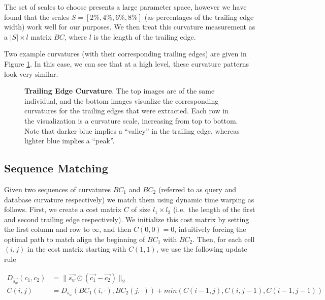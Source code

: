 The set of scales to choose presents a large parameter space, however we have found that the scales $S = [2\%, 4\%, 6\%, 8\%]$ (as percentages of the trailing edge width) work well for our purposes.
We then treat this curvature measurement as a $|S| \times l$ matrix $BC$, where $l$ is the length of the trailing edge.

Two example curvatures (with their corresponding trailing edges) are given in Figure \ref{fig:example_curv}.
In this case, we can see that at a high level, these curvature patterns look very similar.

\begin{figure}[t]%
\centering
{}
\newline
{}
\caption[]{\textbf{Trailing Edge Curvature}. The top images are of the same individual, and the bottom images visualize the corresponding curvatures for the trailing edges that were extracted. Each row in the visualization is a curvature scale, increasing from top to bottom. Note that darker blue implies a ``valley'' in the trailing edge, whereas lighter blue implies a ``peak''.}
\label{fig:example_curv}
\end{figure}




\subsection{Sequence Matching}

Given two sequences of curvatures $BC_1$ and $BC_2$ (referred to as query and database curvature respectively) we match them using dynamic time warping as follows.
First, we create a cost matrix $C$ of size $l_1 \times l_2$ (i.e.\ the length of the first and second trailing edge respectively). 
We initialize this cost matrix by setting the first column and row to $\infty$, and then $C(0,0) = 0$, intuitively forcing the optimal path to match align the beginning of $BC_1$ with $BC_2$.
Then, for each cell $(i,j)$ in the cost matrix starting with $C(1,1)$, we use the following update rule

\begin{align} 
\label{eqn:dtw_dist}
D_{\vec{s_w}}(c_1, c_2) &= \lVert \vec{s_w} \odot (\vec{c_1} - \vec{c_2}) \rVert_2\\
\label{eqn:dtw_update}
C(i,j) &= D_{s_w}(BC_1(i,\cdot),BC_2(j,\cdot)) + min(C(i-1,j), C(i,j-1), C(i-1, j-1))
\end{align}

